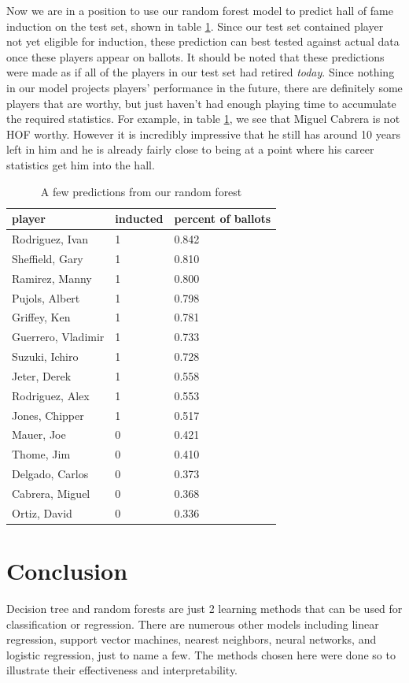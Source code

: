 \documentclass[preprint,12pt]{elsarticle}
\begin{document}
Now we are in a position to use our random forest model to predict hall of fame induction on the test set, shown in table \ref{rfplayers}. Since our test set contained player not yet eligible for induction, these prediction can best tested against actual data once these players appear on ballots. It should be noted that these predictions were made as if all of the players in our test set had retired \textit{today}. Since nothing in our model projects players' performance in the future, there are definitely some players that are worthy, but just haven't had enough playing time to accumulate the required statistics. For example, in table \ref{rfplayers}, we see that Miguel Cabrera is not HOF worthy. However it is incredibly impressive that he still has around 10 years left in him and he is already fairly close to being at a point where his career statistics get him into the hall.


\begin{table}[h]
\centering
\begin{tabular}{|l |l |l|}
\hline
player & inducted & percent of ballots\\
\hline
Rodriguez, Ivan & 1 & 0.842 \\
Sheffield, Gary & 1 & 0.810 \\
Ramirez, Manny & 1 & 0.800 \\
Pujols, Albert & 1 & 0.798 \\ 
Griffey, Ken & 1 & 0.781 \\
Guerrero, Vladimir & 1 & 0.733 \\
Suzuki, Ichiro & 1 & 0.728 \\
Jeter, Derek & 1 & 0.558 \\
Rodriguez, Alex & 1 & 0.553 \\
Jones, Chipper & 1 & 0.517 \\
Mauer, Joe & 0 & 0.421 \\
Thome, Jim & 0 & 0.410 \\
Delgado, Carlos & 0 & 0.373 \\
Cabrera, Miguel & 0 & 0.368 \\
Ortiz, David & 0 & 0.336 \\
\hline
\end{tabular}
\caption{A few predictions from our random forest}
\label{rfplayers}
\end{table}


 


\section{Conclusion}
Decision tree and random forests are just 2 learning methods that can be used for classification or regression. There are numerous other models including linear regression, support vector machines, nearest neighbors, neural networks, and logistic regression, just to name a few. The methods chosen here were done so to illustrate their effectiveness and interpretability.
\end{document}
